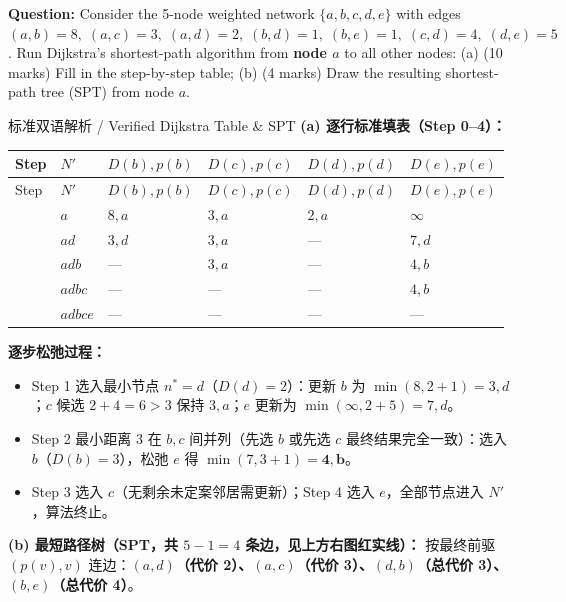 
\textbf{Question:} Consider the 5-node weighted network $\{a, b, c, d, e\}$ with edges $(a,b)=8,\; (a,c)=3,\; (a,d)=2,\; (b,d)=1,\; (b,e)=1,\; (c,d)=4,\; (d,e)=5$. Run Dijkstra's shortest-path algorithm from \textbf{node $a$} to all other nodes: (a) (10 marks) Fill in the step-by-step table; (b) (4 marks) Draw the resulting shortest-path tree (SPT) from node $a$.


\begin{StudySolution}{标准双语解析 / Verified Dijkstra Table \& SPT}
\textbf{(a) 逐行标准填表（Step 0–4）：}

\begingroup\small\setlength{\tabcolsep}{3pt}\renewcommand{\arraystretch}{1.20}
\begin{longtable}{@{}>{\raggedright\arraybackslash}p{}>{\raggedright\arraybackslash}p{}>{\raggedright\arraybackslash}p{}>{\raggedright\arraybackslash}p{}>{\raggedright\arraybackslash}p{}>{\raggedright\arraybackslash}p{}@{}}
\toprule
Step & $N'$ & $D(b),p(b)$ & $D(c),p(c)$ & $D(d),p(d)$ & $D(e),p(e)$ \\
\midrule\endfirsthead
Step & $N'$ & $D(b),p(b)$ & $D(c),p(c)$ & $D(d),p(d)$ & $D(e),p(e)$ \\
\midrule\endhead
\bottomrule\endfoot
0 & $a$ & $8, a$ & $3, a$ & \textbf{$2, a$} & $\infty$ \\
1 & $ad$ & \textbf{$3, d$} & $3, a$ & — & $7, d$ \\
2 & $adb$ & — & \textbf{$3, a$} & — & $4, b$ \\
3 & $adbc$ & — & — & — & \textbf{$4, b$} \\
4 & $adbce$ & — & — & — & — \\
\end{longtable}\endgroup

\textbf{逐步松弛过程：}
\begin{itemize}
\item Step 1 选入最小节点 $n^* = d$（$D(d)=2$）：更新 $b$ 为 $\min(8, 2+1)=3,d$；$c$ 候选 $2+4=6>3$ 保持 $3,a$；$e$ 更新为 $\min(\infty, 2+5)=7,d$。
\item Step 2 最小距离 $3$ 在 $b, c$ 间并列（先选 $b$ 或先选 $c$ 最终结果完全一致）：选入 $b$（$D(b)=3$），松弛 $e$ 得 $\min(7, 3+1)=\mathbf{4,b}$。
\item Step 3 选入 $c$（无剩余未定案邻居需更新）；Step 4 选入 $e$，全部节点进入 $N'$，算法终止。
\end{itemize}

\textbf{(b) 最短路径树（SPT，共 $5-1=4$ 条边，见上方右图红实线）：}
按最终前驱 $(p(v), v)$ 连边：\textbf{$(a, d)$（代价 2）、$(a, c)$（代价 3）、$(d, b)$（总代价 3）、$(b, e)$（总代价 4）}。
\end{StudySolution}


